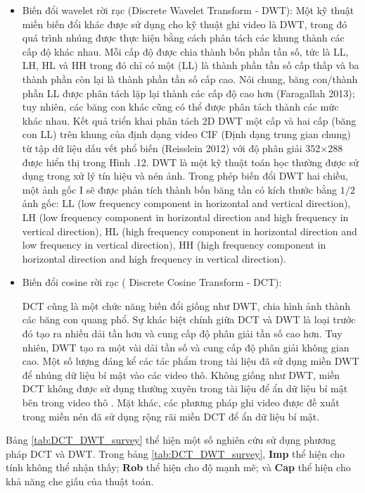 \begin{itemize}
    \begin{itemize}
        \item Biến đổi wavelet rời rạc (Discrete Wavelet Transform - DWT):
Một kỹ thuật miền biến đổi khác được sử dụng cho kỹ thuật ghi video là DWT, trong đó quá trình nhúng được thực hiện bằng cách phân tách các khung thành các cấp độ khác nhau. Mỗi cấp độ được chia thành bốn phần tần số, tức là LL, LH, HL và HH trong đó chỉ có một (LL) là thành phần tần số cấp thấp và ba thành phần còn lại là thành phần tần số cấp cao. Nói chung, băng con/thành phần LL được phân tách lặp lại thành các cấp độ cao hơn (Faragallah 2013); tuy nhiên, các băng con khác cũng có thể được phân tách thành các mức khác nhau. Kết quả triển khai phân tách 2D DWT một cấp và hai cấp (băng con LL) trên khung của định dạng video CIF (Định dạng trung gian chung) từ tập dữ liệu dấu vết phổ biến (Reisslein 2012) với độ phân giải 352×288 được hiển thị trong Hình .12.
DWT là một kỹ thuật toán học thường được sử dụng trong xử lý tín hiệu và nén ảnh. Trong phép biến đổi DWT hai chiều, một ảnh gốc I sẽ được phân tích thành bốn băng tần có kích thước bằng $1/2$ ảnh gốc: LL (low frequency component in horizontal and vertical direction), LH (low frequency component in horizontal direction and high frequency in vertical direction), HL (high frequency component in horizontal direction and low frequency in vertical direction), HH (high frequency component in horizontal direction and high frequency in vertical direction).

        \item Biến đổi cosine rời rạc ( Discrete Cosine Transform - DCT):

DCT cũng là một chức năng biến đổi giống như DWT, chia hình ảnh thành các băng con quang phổ. Sự khác biệt chính giữa DCT và DWT là loại trước đó tạo ra nhiều dải tần hơn và cung cấp độ phân giải tần số cao hơn. Tuy nhiên, DWT tạo ra một vài dải tần số và cung cấp độ phân giải không gian cao. Một số lượng đáng kể các tác phẩm trong tài liệu đã sử dụng miền DWT để nhúng dữ liệu bí mật vào các video thô. Không giống như DWT, miền DCT không được sử dụng thường xuyên trong tài liệu để ẩn dữ liệu bí mật bên trong video thô . Mặt khác, các phương pháp ghi video được đề xuất trong miền nén đã sử dụng rộng rãi miền DCT để ẩn dữ liệu bí mật.

    \end{itemize}
\end{itemize}

Bảng \ref{tab:DCT_DWT_survey} thể hiện một số nghiên cứu sử dụng phương pháp DCT và DWT. Trong bảng \ref{tab:DCT_DWT_survey}, \textbf{Imp} thể hiện cho tính không thể nhận thấy; \textbf{Rob} thể hiện cho độ mạnh mẽ; và \textbf{Cap} thể hiện cho khả năng che giấu của thuật toán.


